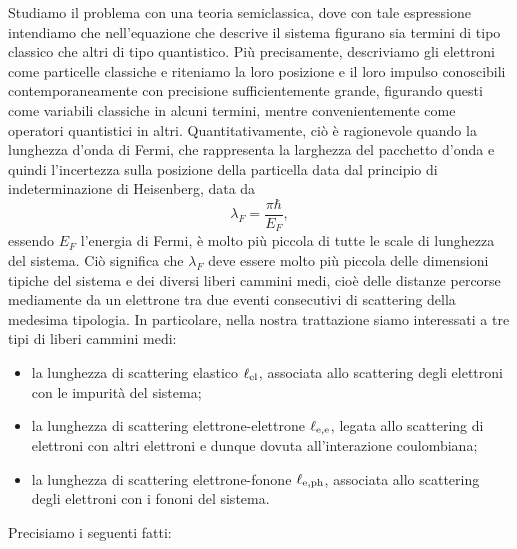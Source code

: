 Studiamo il problema con una teoria semiclassica, dove con tale espressione intendiamo che nell'equazione che descrive il sistema figurano sia termini di tipo classico che altri di tipo quantistico. Più precisamente, descriviamo gli elettroni come particelle classiche e riteniamo la loro posizione e il loro impulso conoscibili contemporaneamente con precisione sufficientemente grande, figurando questi come variabili classiche in alcuni termini, mentre convenientemente come operatori quantistici in altri. Quantitativamente, ciò è ragionevole quando la lunghezza d'onda di Fermi, che rappresenta la larghezza del pacchetto d'onda e quindi l'incertezza sulla posizione della particella data dal principio di indeterminazione di Heisenberg, data da
\begin{equation*}
    \lambda_F=\frac{\pi \hbar}{E_F},
\end{equation*}
essendo $E_F$ l'energia di Fermi, è molto più piccola di tutte le scale di lunghezza del sistema. Ciò significa che $\lambda_F$ deve essere molto più piccola delle dimensioni tipiche del sistema e dei diversi liberi cammini medi, cioè delle distanze percorse mediamente da un elettrone tra due eventi consecutivi di scattering della medesima tipologia. In particolare, nella nostra trattazione siamo interessati a tre tipi di liberi cammini medi:
\begin{itemize}[leftmargin=0.5cm]
    \item la lunghezza di scattering elastico $\ell_{\rm el}$, associata allo scattering degli elettroni con le impurità del sistema;
    \item la lunghezza di scattering elettrone-elettrone $\ell_{\rm e,e}$, legata allo scattering di elettroni con altri elettroni e dunque dovuta all'interazione coulombiana;
    \item la lunghezza di scattering elettrone-fonone $\ell_{\rm e,ph}$, associata allo scattering degli elettroni con i fononi del sistema.
\end{itemize}
Precisiamo i seguenti fatti:
